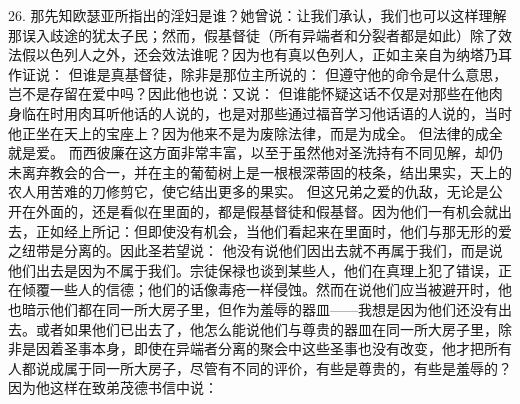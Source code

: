 26. 那先知欧瑟亚所指出的淫妇是谁？她曾说：让我们承认，我们也可以这样理解那误入歧途的犹太子民；然而，假基督徒（所有异端者和分裂者都是如此）除了效法假以色列人之外，还会效法谁呢？因为也有真以色列人，正如主亲自为纳塔乃耳作证说： 但谁是真基督徒，除非是那位主所说的： 但遵守他的命令是什么意思，岂不是存留在爱中吗？因此他也说：又说： 但谁能怀疑这话不仅是对那些在他肉身临在时用肉耳听他话的人说的，也是对那些通过福音学习他话语的人说的，当时他正坐在天上的宝座上？因为他来不是为废除法律，而是为成全。 但法律的成全就是爱。 而西彼廉在这方面非常丰富，以至于虽然他对圣洗持有不同见解，却仍未离弃教会的合一，并在主的葡萄树上是一根根深蒂固的枝条，结出果实，天上的农人用苦难的刀修剪它，使它结出更多的果实。 但这兄弟之爱的仇敌，无论是公开在外面的，还是看似在里面的，都是假基督徒和假基督。因为他们一有机会就出去，正如经上所记：但即使没有机会，当他们看起来在里面时，他们与那无形的爱之纽带是分离的。因此圣若望说： 他没有说他们因出去就不再属于我们，而是说他们出去是因为不属于我们。宗徒保禄也谈到某些人，他们在真理上犯了错误，正在倾覆一些人的信德；他们的话像毒疮一样侵蚀。然而在说他们应当被避开时，他也暗示他们都在同一所大房子里，但作为羞辱的器皿——我想是因为他们还没有出去。或者如果他们已出去了，他怎么能说他们与尊贵的器皿在同一所大房子里，除非是因着圣事本身，即使在异端者分离的聚会中这些圣事也没有改变，他才把所有人都说成属于同一所大房子，尽管有不同的评价，有些是尊贵的，有些是羞辱的？因为他这样在致弟茂德书信中说：\par

